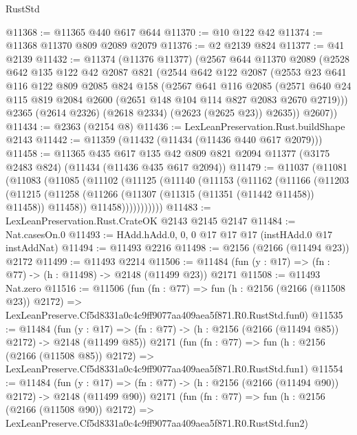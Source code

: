 \begin{lexlean}{RustStd}
\begin{coremodule}
@11368 := @11365 @440 @617 @644
@11370 := @10 @122 @42
@11374 := @11368 @11370 @809 @2089 @2079
@11376 := @2 @2139 @824
@11377 := @41 @2139
@11432 := @11374
    (@11376 @11377)
    (@2567
      @644
      @11370
      @2089
      (@2528
        @642
        @135
        @122
        @42
        @2087
        @821
        (@2544
          @642
          @122
          @2087
          (@2553
            @23
            @641
            @116
            @122
            @809
            @2085
            @824
            @158
            (@2567
              @641
              @116
              @2085
              (@2571 @640 @24 @115 @819 @2084 @2600 (@2651 @148 @104 @114 @827 @2083 @2670 @2719)))
            @2365
            (@2614 @2326)
            (@2618 @2334)
            (@2623 (@2625 @23))
            @2635))
        @2607))
@11434 := @2363 (@2154 @8)
@11436 := LexLeanPreservation.Rust.buildShape @2143
@11442 := @11359 (@11432 (@11434 (@11436 @440 @617 @2079)))
@11458 := @11365
    @435
    @617
    @135
    @42
    @809
    @821
    @2094
    @11377
    (@3175 @2483 @824)
    (@11434 (@11436 @435 @617 @2094))
@11479 := @11037
    (@11081
      (@11083
        (@11085
          (@11102
            (@11125
              (@11140
                (@11153
                  (@11162
                    (@11166
                      (@11203
                        (@11215
                          (@11258 (@11266 (@11307 (@11315 (@11351 (@11442 @11458)) @11458)) @11458))
                          @11458)))))))))))
@11483 := LexLeanPreservation.Rust.CrateOK @2143 @2145 @2147
@11484 := Nat.casesOn.{0}
@11493 := HAdd.hAdd.{0, 0, 0} @17 @17 @17 (instHAdd.{0} @17 instAddNat)
@11494 := @11493 @2216
@11498 := @2156 (@2166 (@11494 @23)) @2172
@11499 := @11493 @2214
@11506 := @11484 (fun (y : @17) => (fn : @77) -> (h : @11498) -> @2148 (@11499 @23)) @2171
@11508 := @11493 Nat.zero
@11516 := @11506
    (fun (fn : @77) =>
    fun (h : @2156 (@2166 (@11508 @23)) @2172) =>
    LexLeanPreserve.Cf5d8331a0c4c9ff9077aa409aea5f871.R0.RustStd.fun0)
@11535 := @11484
    (fun (y : @17) => (fn : @77) -> (h : @2156 (@2166 (@11494 @85)) @2172) -> @2148 (@11499 @85))
    @2171
    (fun (fn : @77) =>
    fun (h : @2156 (@2166 (@11508 @85)) @2172) =>
    LexLeanPreserve.Cf5d8331a0c4c9ff9077aa409aea5f871.R0.RustStd.fun1)
@11554 := @11484
    (fun (y : @17) => (fn : @77) -> (h : @2156 (@2166 (@11494 @90)) @2172) -> @2148 (@11499 @90))
    @2171
    (fun (fn : @77) =>
    fun (h : @2156 (@2166 (@11508 @90)) @2172) =>
    LexLeanPreserve.Cf5d8331a0c4c9ff9077aa409aea5f871.R0.RustStd.fun2)

\end{coremodule}
\end{lexlean}
